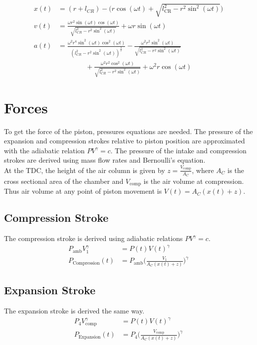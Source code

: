 \documentclass[10pt,a4paper]{article}
\begin{document}
\begin{align}
	x(t ) &= (r + l_{CR}) - \Big(r \cos (\omega t)  + \sqrt{l_{\text{CR}}^2 - r^2 \sin^2 (\omega t )} \Big)\\
	v(t ) &=  \frac{\omega r^{2} \sin{\left (\omega t \right )} \cos{\left (\omega t \right )}}{\sqrt{l_{CR}^{2} - r^{2} \sin^{2}{\left (\omega t \right )}}} + \omega r \sin{\left (\omega t \right )}\\
	a (t) &=  \frac{\omega^{2} r^{4} \sin^{2}{\left (\omega t \right )} \cos^{2}{\left (\omega t \right )}}{\left(l_{CR}^{2} - r^{2} \sin^{2}{\left (\omega t \right )}\right)^{\frac{3}{2}}} - \frac{\omega^{2} r^{2} \sin^{2}{\left (\omega t \right )}}{\sqrt{l_{CR}^{2} - r^{2} \sin^{2}{\left (\omega t \right )}}}\nonumber \\
	&  \qquad \qquad + \frac{\omega^{2} r^{2} \cos^{2}{\left (\omega t \right )}}{\sqrt{l_{CR}^{2} - r^{2} \sin^{2}{\left (\omega t \right )}}} + \omega^{2} r \cos{\left (\omega t \right )}
\end{align}
\newpage

\section*{Forces}
To get the force of the piston, pressures equations are needed. The pressure of the expansion and compression strokes relative to piston position are approximated with the adiabatic relation $P V^{\gamma} = c$.
The pressure of the intake and compression strokes are derived using mass flow rates and Bernoulli's equation.\\
At the TDC, the height of the air column is given by $z = \frac{V_{\text{comp}}}{A_C}$, where $A_C$ is the cross sectional area of the chamber and $V_{\text{comp}}$ is the air volume at compression.\\ Thus air volume at any point of piston movement is $V(t) = A_C (x(t)+z)$.
\subsection*{Compression Stroke}
The compression stroke is derived using adiabatic relations $P V^{\gamma} = c$.
\begin{align}
	P_{\text{amb}} V_1^{\gamma} &= P(t) V(t)^{\gamma}\\
	P_{\text{Compression}}(t) &= P_{\text{amb}} \Big( \frac{V_1}{A_C (x(t)+z)} \Big)^{\gamma}
\end{align}
\subsection*{Expansion Stroke} 
The expansion stroke is derived the same way.
\begin{align}
	P_{4} V_{\text{comp}}^{\gamma} &= P(t) V(t)^{\gamma}\\
	P_{\text{Expansion}}(t) &= P_{4} \Big( \frac{V_{\text{comp}}}{A_C (x(t)+z)} \Big)^{\gamma}
\end{align}
\end{document}
